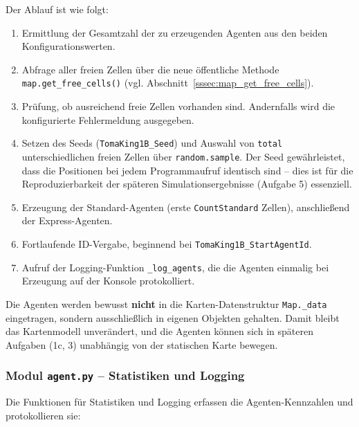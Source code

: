 Der Ablauf ist wie folgt:
\begin{enumerate}
    \item Ermittlung der Gesamtzahl der zu erzeugenden Agenten aus den beiden Konfigurationswerten.
    \item Abfrage aller freien Zellen über die neue öffentliche Methode \texttt{map.get\_free\_cells()} (vgl. Abschnitt~\ref{sssec:map_get_free_cells}).
    \item Prüfung, ob ausreichend freie Zellen vorhanden sind. Andernfalls wird die konfigurierte Fehlermeldung ausgegeben.
    \item Setzen des Seeds (\texttt{TomaKing1B\_Seed}) und Auswahl von \texttt{total} unterschiedlichen freien Zellen über \texttt{random.sample}. Der Seed gewährleistet, dass die Positionen bei jedem Programmaufruf identisch sind -- dies ist für die Reproduzierbarkeit der späteren Simulationsergebnisse (Aufgabe 5) essenziell.
    \item Erzeugung der Standard-Agenten (erste \texttt{CountStandard} Zellen), anschließend der Express-Agenten.
    \item Fortlaufende ID-Vergabe, beginnend bei \texttt{TomaKing1B\_StartAgentId}.
    \item Aufruf der Logging-Funktion \texttt{\_log\_agents}, die die Agenten einmalig bei Erzeugung auf der Konsole protokolliert.
\end{enumerate}

Die Agenten werden bewusst \textbf{nicht} in die Karten-Datenstruktur \texttt{Map.\_data} eingetragen, sondern ausschließlich in eigenen Objekten gehalten. Damit bleibt das Kartenmodell unverändert, und die Agenten können sich in späteren Aufgaben (1c, 3) unabhängig von der statischen Karte bewegen.


\subsubsection{Modul \texttt{agent.py} – Statistiken und Logging}
\label{sssec:agent_stats}

Die Funktionen für Statistiken und Logging erfassen die Agenten-Kennzahlen und protokollieren sie:



